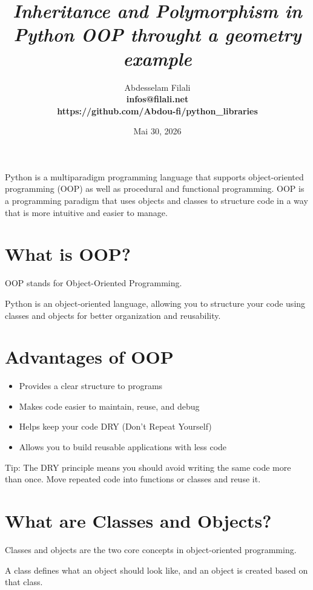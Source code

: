 \documentclass[11pt]{article}
\title{\textbf{\textit{Inheritance and Polymorphism in Python OOP throught a geometry example}}}
\date{Mai 30, 2026}
\author{Abdesselam Filali \\ {\small \textbf{infos@filali.net}} \\ {\small \textbf{https://github.com/Abdou-fi/python\_libraries}}}
\providecommand{\tightlist}{%
      \setlength{\itemsep}{0pt}\setlength{\parskip}{0pt}}
\begin{document}
    
    \maketitle
    
    


Python is a multiparadigm programming language that supports
object-oriented programming (OOP) as well as procedural and functional
programming. OOP is a programming paradigm that uses objects and classes
to structure code in a way that is more intuitive and easier to manage.

\section{What is OOP?}\label{what-is-oop}

OOP stands for Object-Oriented Programming.

Python is an object-oriented language, allowing you to structure your
code using classes and objects for better organization and reusability.

\section{Advantages of OOP}\label{advantages-of-oop}

\begin{itemize}
\tightlist
\item
  Provides a clear structure to programs
\item
  Makes code easier to maintain, reuse, and debug
\item
  Helps keep your code DRY (Don't Repeat Yourself)
\item
  Allows you to build reusable applications with less code
\end{itemize}

Tip: The DRY principle means you should avoid writing the same code more
than once. Move repeated code into functions or classes and reuse it.

\section{What are Classes and Objects?}\label{what-are-classes-and-objects}

Classes and objects are the two core concepts in object-oriented
programming.

A class defines what an object should look like, and an object is
created based on that class. 
\end{document}
